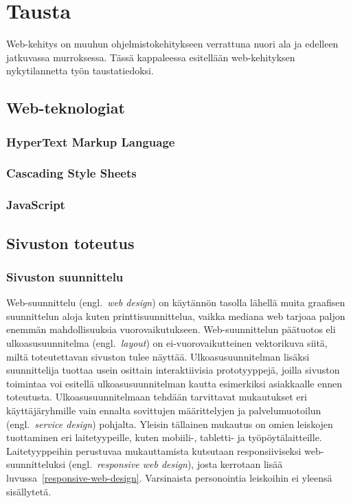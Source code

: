 \documentclass[finnish, 12pt, a4paper, elec, utf8, a-1b, online]{aaltothesis}
\begin{document}
\clearpage

\section{Tausta}\label{background}

Web-kehitys on muuhun ohjelmistokehitykseen verrattuna nuori ala ja
edelleen jatkuvassa murroksessa. Tässä kappaleessa esitellään web-kehityksen
nykytilannetta työn taustatiedoksi.

\subsection{Web-teknologiat}

\subsubsection{HyperText Markup Language}

\subsubsection{Cascading Style Sheets}

\subsubsection{JavaScript}

\subsection{Sivuston toteutus}

\subsubsection{Sivuston suunnittelu}

Web-suunnittelu (engl.~\textit{web design}) on käytännön tasolla lähellä muita
graafisen suunnittelun aloja kuten printtisuunnittelua, vaikka mediana web
tarjoaa paljon enemmän mahdollisuuksia vuorovaikutukseen. Web-suunnittelun
päätuotos eli ulkoasusuunnitelma (engl.~\textit{layout}) on ei-vuorovaikutteinen
vektorikuva siitä, miltä toteutettavan sivuston tulee näyttää.
Ulkoasusuunnitelman lisäksi suunnittelija tuottaa usein osittain interaktiivisia
prototyyppejä, joilla sivuston toimintaa voi esitellä ulkoasusuunnitelman kautta
esimerkiksi asiakkaalle ennen toteutusta. Ulkoasusuunnitelmaan tehdään
tarvittavat mukautukset eri käyttäjäryhmille vain ennalta sovittujen
määrittelyjen ja palvelumuotoilun (engl.~\textit{service design}) pohjalta.
Yleisin tällainen mukautus on omien leiskojen tuottaminen eri laitetyypeille,
kuten mobiili-, tabletti- ja työpöytälaitteille. Laitetyyppeihin perustuvaa
mukauttamista kutsutaan responsiiviseksi web-suunnitteluksi
(engl.~\textit{responsive web design}), josta kerrotaan lisää
luvussa~\ref{responsive-web-design}. Varsinaista personointia leiskoihin ei
yleensä sisällytetä.
\end{document}
